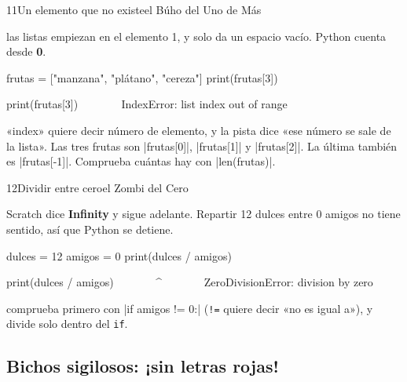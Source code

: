 \begin{bzcard}{11}{Un elemento que no existe}{el Búho del Uno de Más}
\noindent\begin{minipage}[c]{0.43\linewidth}
 las listas empiezan en el elemento 1, y  solo da un espacio vacío. Python cuenta desde \textbf{0}.
\end{minipage}\hfill
\begin{minipage}[c]{0.54\linewidth}
\begin{bzsnip}
frutas = ["manzana", "plátano", "cereza"]
print(frutas[3])
\end{bzsnip}
\end{minipage}\par
\begin{bzerror}
    print(frutas[3])
          ~~~~~~^^^
IndexError: list index out of range
\end{bzerror}
 «index» quiere decir número de elemento, y la pista dice «ese número se sale de la lista». Las tres frutas son \py|frutas[0]|, \py|frutas[1]| y \py|frutas[2]|. La última también es \py|frutas[-1]|. Comprueba cuántas hay con \py|len(frutas)|.
\end{bzcard}

\begin{bzcard}{12}{Dividir entre cero}{el Zombi del Cero}
\noindent\begin{minipage}[c]{0.43\linewidth}
 Scratch dice \textbf{Infinity} y sigue adelante. Repartir 12 dulces entre 0 amigos no tiene sentido, así que Python se detiene.
\end{minipage}\hfill
\begin{minipage}[c]{0.54\linewidth}
\begin{bzsnip}
dulces = 12
amigos = 0
print(dulces / amigos)
\end{bzsnip}
\end{minipage}\par
\begin{bzerror}
    print(dulces / amigos)
          ~~~~~~~^~~~~~~~
ZeroDivisionError: division by zero
\end{bzerror}
 comprueba primero con \py|if amigos != 0:| (\texttt{!=} quiere decir «no es igual a»), y divide solo dentro del \texttt{if}.
\end{bzcard}

\clearpage
\subsection*{Bichos sigilosos: ¡sin letras rojas!}

